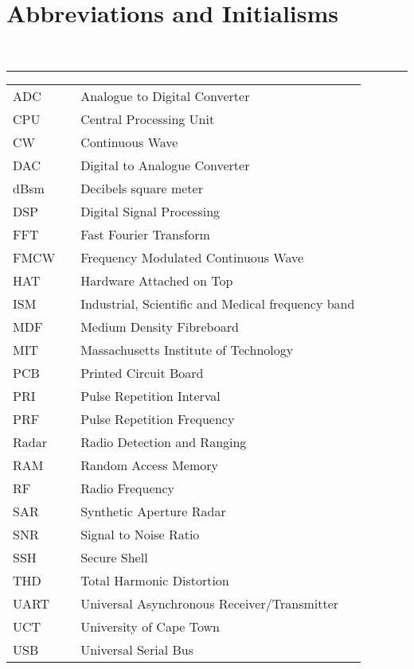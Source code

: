 {\smallest\chapter*{Abbreviations and Initialisms}\label{chap:Abbreviations and Initialisms}}\\
\hrule
\begin{table}[h!]
	\centering\renewcommand{\arraystretch}{1.5}
	\begin{tabular}{p{2cm} p{0.5cm} p{15cm}}
    ADC & & Analogue to Digital Converter \\
    CPU & & Central Processing Unit \\
	CW & & Continuous Wave \\
    DAC & & Digital to Analogue Converter \\
    dBsm & & Decibels square meter \\
    DSP & & Digital Signal Processing \\
	FFT & & Fast Fourier Transform \\
	FMCW & & Frequency Modulated Continuous Wave \\
    HAT & & Hardware Attached on Top \\
    ISM & & Industrial, Scientific and Medical frequency band \\
    MDF & & Medium Density Fibreboard \\
    MIT & & Massachusetts Institute of Technology \\
    PCB & & Printed Circuit Board \\
	PRI  & & Pulse Repetition Interval \\
    PRF & & Pulse Repetition Frequency \\
    Radar & & Radio Detection and Ranging \\
    RAM & & Random Access Memory \\
    RF & & Radio Frequency \\
	SAR & & Synthetic Aperture Radar \\
    SNR & & Signal to Noise Ratio \\
    SSH & & Secure Shell \\
    THD & & Total Harmonic Distortion \\
    UART & & Universal Asynchronous Receiver/Transmitter \\
    UCT & & University of Cape Town \\
    USB & & Universal Serial Bus \\
	\end{tabular}
\end{table}

\newpage
